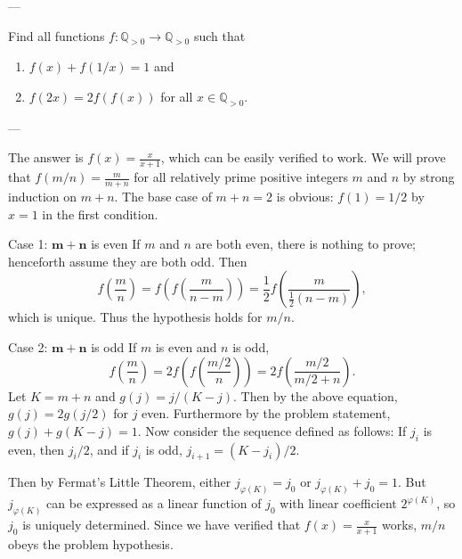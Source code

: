 
---

Find all functions $f:\mathbb Q_{>0}\to\mathbb Q_{>0}$ such that
\begin{enumerate}[label=(\roman*),itemsep=0em]
    \item $f(x)+f(1/x)=1$ and
    \item $f(2x)=2f(f(x))$ for all $x\in\mathbb Q_{>0}$.
\end{enumerate}

---

The answer is $f(x)=\frac x{x+1}$, which can be easily verified to work. We will prove that $f(m/n)=\frac m{m+n}$ for all relatively prime positive integers $m$ and $n$ by strong induction on $m+n$. The base case of $m+n=2$ is obvious: $f(1)=1/2$ by $x=1$ in the first condition.
\begin{customenv}{Case 1: $\pmb{m+n}$ is even}
    If $m$ and $n$ are both even, there is nothing to prove; henceforth assume they are both odd. Then \[f\left(\frac mn\right)=f\left(f\left(\frac m{n-m}\right)\right)=\frac12f\left(\frac m{\frac12(n-m)}\right),\]
    which is unique. Thus the hypothesis holds for $m/n$.
\end{customenv}
\begin{customenv}{Case 2: $\pmb{m+n}$ is odd}
    If $m$ is even and $n$ is odd, \[f\left(\frac mn\right)=2f\left(f\left(\frac{m/2}n\right)\right)=2f\left(\frac{m/2}{m/2+n}\right).\]
    Let $K=m+n$ and $g(j)=j/(K-j)$. Then by the above equation, $g(j)=2g(j/2)$ for $j$ even. Furthermore by the problem statement, $g(j)+g(K-j)=1$. Now consider the sequence defined as follows: If $j_i$ is even, then $j_i/2$, and if $j_i$ is odd, $j_{i+1}=(K-j_i)/2$.

    Then by Fermat's Little Theorem, either $j_{\varphi(K)}=j_0$ or $j_{\varphi(K)}+j_0=1$. But $j_{\varphi(K)}$ can be expressed as a linear function of $j_0$ with linear coefficient $2^{\varphi(K)}$, so $j_0$ is uniquely determined. Since we have verified that $f(x)=\frac x{x+1}$ works, $m/n$ obeys the problem hypothesis.
\end{customenv}

